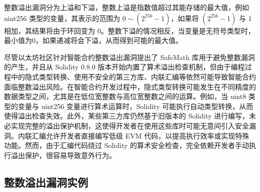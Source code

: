 \documentclass[print, master, vlined, timesmath]{DissertUESTC}
\begin{document}
整数溢出漏洞分为上溢和下溢，整数上溢是指数值超过其能存储的最大值，例如 uint256 类型的变量，其表示的范围为 \(0\sim (2^{256}-1)\)，如果将 \((2^{256}-1)\) 与 \(1\) 相加，其结果将由于环回变为 \(0\)。整数下溢的情况相反，当变量是无符号类型时，最小值为0，如果递减将会下溢，从而得到可能的最大值。

尽管以太坊社区针对智能合约整数溢出漏洞提出了 SafeMath 库用于避免整数漏洞的产生，并且从 Solidity 0.8.0 版本开始内置了算术溢出检查机制，但由于编程过程中的隐式类型转换、使用不安全的第三方库、内联汇编等依然可能导致智能合约面临整数溢出风险。在智能合约开发过程中，隐式类型转换可能发生在不同精度的数据类型之间，尤其是在低位宽整数与高位宽整数之间的运算。例如，当 uint8 类型的变量与 uint256 变量进行算术运算时，Solidity 可能执行自动类型转换，从而使得溢出检查失效。此外，某些第三方库仍然基于旧版本的 Solidity 进行编写，未必实现完整的溢出保护机制，这使得开发者在使用这些库时可能无意间引入安全漏洞。内联汇编允许开发者直接编写低级 EVM 代码，以提高执行效率或实现特殊功能。然而，由于汇编代码绕过 Solidity 的算术安全检查，完全依赖开发者手动执行溢出保护，很容易导致意外行为。
    
    

\subsection{整数溢出漏洞实例}






\end{document}
